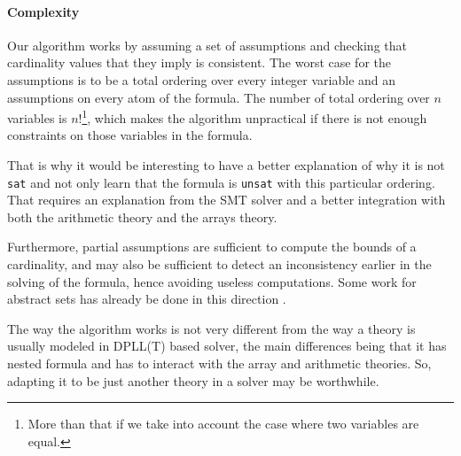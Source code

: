 \paragraph{Complexity}

Our algorithm works by assuming a set of assumptions and checking that
cardinality values that they imply is consistent. The worst case for the
assumptions is to be a total ordering over every integer variable and an
assumptions on every atom of the formula. The number of total ordering
over $n$ variables is
$n!$\footnote{More than that if we take into account the case where two variables are equal.},
which makes the algorithm unpractical if there is not enough constraints
on those variables in the formula.

That is why it would be interesting to have a better explanation of why
it is not \texttt{sat} and not only learn that the formula is
\texttt{unsat} with this particular ordering. That requires an
explanation from the SMT solver and a better integration with both the
arithmetic theory and the arrays theory.

Furthermore, partial assumptions are sufficient to compute the bounds of
a cardinality, and may also be sufficient to detect an inconsistency
earlier in the solving of the formula, hence avoiding useless
computations. Some work for abstract sets has already be done in this
direction \cite{cardinalityset}.

The way the algorithm works is not very different from the way a theory
is usually modeled in DPLL(T) based solver, the main differences being
that it has nested formula and has to interact with the array and
arithmetic theories. So, adapting it to be just another theory in a
solver may be worthwhile.
